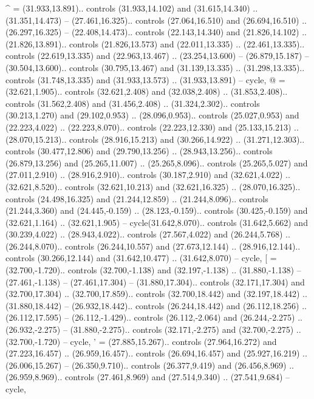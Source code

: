 {^} = {(31.933,13.891).. controls (31.933,14.102) and (31.615,14.340) .. (31.351,14.473) -- (27.461,16.325).. controls (27.064,16.510) and (26.694,16.510) .. (26.297,16.325) -- (22.408,14.473).. controls (22.143,14.340) and (21.826,14.102) .. (21.826,13.891).. controls (21.826,13.573) and (22.011,13.335) .. (22.461,13.335).. controls (22.619,13.335) and (22.963,13.467) .. (23.254,13.600) -- (26.879,15.187) -- (30.504,13.600).. controls (30.795,13.467) and (31.139,13.335) .. (31.298,13.335).. controls (31.748,13.335) and (31.933,13.573) .. (31.933,13.891) -- cycle},
{@} = {(32.621,1.905).. controls (32.621,2.408) and (32.038,2.408) .. (31.853,2.408).. controls (31.562,2.408) and (31.456,2.408) .. (31.324,2.302).. controls (30.213,1.270) and (29.102,0.953) .. (28.096,0.953).. controls (25.027,0.953) and (22.223,4.022) .. (22.223,8.070).. controls (22.223,12.330) and (25.133,15.213) .. (28.070,15.213).. controls (28.916,15.213) and (30.266,14.922) .. (31.271,12.303).. controls (30.477,12.806) and (29.790,13.256) .. (28.943,13.256).. controls (26.879,13.256) and (25.265,11.007) .. (25.265,8.096).. controls (25.265,5.027) and (27.011,2.910) .. (28.916,2.910).. controls (30.187,2.910) and (32.621,4.022) .. (32.621,8.520).. controls (32.621,10.213) and (32.621,16.325) .. (28.070,16.325).. controls (24.498,16.325) and (21.244,12.859) .. (21.244,8.096).. controls (21.244,3.360) and (24.445,-0.159) .. (28.123,-0.159).. controls (30.425,-0.159) and (32.621,1.164) .. (32.621,1.905) -- cycle(31.642,8.070).. controls (31.642,5.662) and (30.239,4.022) .. (28.943,4.022).. controls (27.567,4.022) and (26.244,5.768) .. (26.244,8.070).. controls (26.244,10.557) and (27.673,12.144) .. (28.916,12.144).. controls (30.266,12.144) and (31.642,10.477) .. (31.642,8.070) -- cycle},
{[} = {(32.700,-1.720).. controls (32.700,-1.138) and (32.197,-1.138) .. (31.880,-1.138) -- (27.461,-1.138) -- (27.461,17.304) -- (31.880,17.304).. controls (32.171,17.304) and (32.700,17.304) .. (32.700,17.859).. controls (32.700,18.442) and (32.197,18.442) .. (31.880,18.442) -- (26.932,18.442).. controls (26.244,18.442) and (26.112,18.256) .. (26.112,17.595) -- (26.112,-1.429).. controls (26.112,-2.064) and (26.244,-2.275) .. (26.932,-2.275) -- (31.880,-2.275).. controls (32.171,-2.275) and (32.700,-2.275) .. (32.700,-1.720) -- cycle},
{'} = {(27.885,15.267).. controls (27.964,16.272) and (27.223,16.457) .. (26.959,16.457).. controls (26.694,16.457) and (25.927,16.219) .. (26.006,15.267) -- (26.350,9.710).. controls (26.377,9.419) and (26.456,8.969) .. (26.959,8.969).. controls (27.461,8.969) and (27.514,9.340) .. (27.541,9.684) -- cycle},
